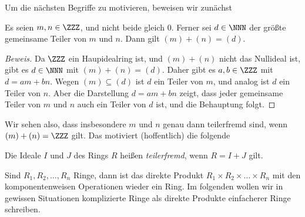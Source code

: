 \documentclass[12pt,a4paper,twoside]{article}
\newcommand{\ei}[1]{\emph{#1}\index{#1}}
\begin{document}
Um die n\"achsten Begriffe zu motivieren, beweisen wir zun\"achst
\begin{Lemma}\label{L:mn}
  Es seien $m,n\in\ZZZ$, und nicht beide gleich $0$. Ferner sei $d\in\NNN$ der
  gr\"o\ss te gemeinsame Teiler von $m$ und $n$. Dann gilt $(m)+(n)=(d)$.
\end{Lemma}
\begin{proof}[Beweis]
  Da $\ZZZ$ ein Haupidealring ist, und $(m)+(n)$ nicht das Nullideal ist, gibt
  es $d\in\NNN$ mit $(m)+(n)=(d)$. Daher gibt es $a,b\in\ZZZ$ mit
  $d=am+bn$. Wegen $(m)\subseteq (d)$ ist $d$ ein Teiler von $m$, und analog
  ist $d$ ein Teiler von $n$. Aber die Darstellung $d=am+bn$ zeigt, dass jeder
  gemeinsame Teiler von $m$ und $n$ auch ein Teiler von $d$ ist, und die
  Behauptung folgt.
\end{proof}
Wir sehen also, dass insbesondere $m$ und $n$ genau dann teilerfremd sind,
wenn $(m)+(n)=\ZZZ$ gilt. Das motiviert (hoffentlich) die folgende
\begin{Definition}
  Die Ideale $I$ und $J$ des Rings $R$ hei\ss en \ei{teilerfremd}, wenn
  $R=I+J$ gilt.
\end{Definition}
Sind $R_1,R_2,\dots,R_n$ Ringe, dann ist das direkte Produkt $R_1\times
R_2\times\dots\times R_n$ mit den komponentenweisen Operationen wieder ein
Ring. Im folgenden wollen wir in gewissen Situationen komplizierte Ringe als
direkte Produkte einfacherer Ringe schreiben.
\end{document}
